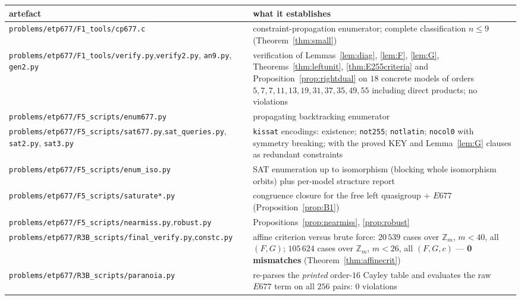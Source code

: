 \documentclass[11pt]{article}
\theoremstyle{plain}
\theoremstyle{definition}
\theoremstyle{remark}
\numberwithin{equation}{section}
\newcommand{\Z}{\mathbb{Z}}
\begin{document}
\begin{longtable}{p{}p{}}
\toprule
artefact & what it establishes\\
\midrule
\endhead
\texttt{problems\slash etp677\slash F1\_tools\slash cp677.c} & constraint-propagation enumerator; complete
classification $n\le9$ (Theorem~\ref{thm:small})\\
\texttt{problems\slash etp677\slash F1\_tools\slash verify.py},\newline\texttt{verify2.py}, \texttt{an9.py},
\texttt{gen2.py} & verification of Lemmas~\ref{lem:diag}, \ref{lem:F}, \ref{lem:G},
Theorems~\ref{thm:leftunit}, \ref{thm:E255criteria} and
Proposition~\ref{prop:rightdual} on $18$ concrete models of orders
$5,7,7,11,13,19,31,37,35,49,55$ including direct products; no violations\\
\texttt{problems\slash etp677\slash F5\_scripts\slash enum677.py} & propagating backtracking enumerator\\
\texttt{problems\slash etp677\slash F5\_scripts\slash sat677.py},\newline\texttt{sat\_queries.py},
\texttt{sat2.py}, \texttt{sat3.py} & \texttt{kissat} encodings: existence; \texttt{not255};
\texttt{notlatin}; \texttt{nocol0} with symmetry breaking; with the proved $\mathrm{KEY}$
and Lemma~\ref{lem:G} clauses as redundant constraints\\
\texttt{problems\slash etp677\slash F5\_scripts\slash enum\_iso.py} & SAT enumeration up to isomorphism
(blocking whole isomorphism orbits) plus per-model structure report\\
\texttt{problems\slash etp677\slash F5\_scripts\slash saturate*.py} & congruence closure for the free left
quasigroup $+$ $E677$ (Proposition~\ref{prop:B1})\\
\texttt{problems\slash etp677\slash F5\_scripts\slash nearmiss.py},\newline\texttt{robust.py} &
Propositions~\ref{prop:nearmiss}, \ref{prop:robust}\\
\texttt{problems\slash etp677\slash R3B\_scripts\slash final\_verify.py},\newline\texttt{constc.py} & affine
criterion versus brute force: $20\,539$ cases over $\Z_m$, $m<40$, all $(F,G)$; $105\,624$
cases over $\Z_m$, $m<26$, all $(F,G,c)$ --- \textbf{0 mismatches}
(Theorem~\ref{thm:affinecrit})\\
\texttt{problems\slash etp677\slash R3B\_scripts\slash paranoia.py} & re-parses the \emph{printed} order-$16$
Cayley table and evaluates the raw $E677$ term on all $256$ pairs: $0$ violations

\end{longtable}
\end{document}
